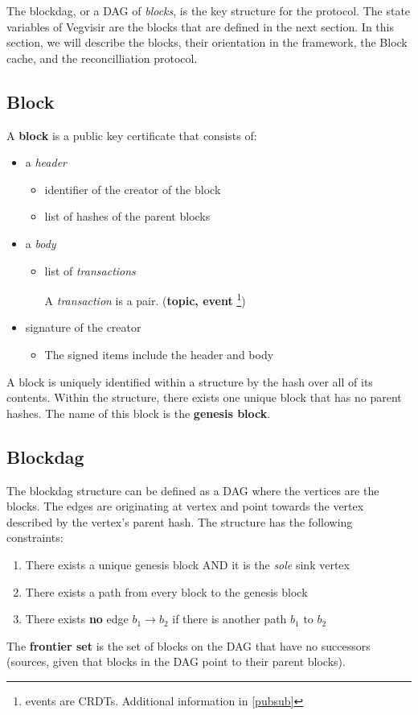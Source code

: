 The blockdag, or a DAG of \emph{blocks}, is the key structure for the protocol.
The state variables of Vegvisir are the blocks that are defined in the next
section. In this section, we will describe the blocks, their orientation in the
framework, the Block cache, and the reconcilliation protocol. 

\subsection{Block}
A \textbf{block} is a public key certificate that consists of:
\begin{itemize}
    \item a \emph{header}
    \begin{itemize}
        \item{identifier of the creator of the block}
        \item{list of hashes of the parent blocks}
    \end{itemize}
    \item a \emph{body}
        \begin{itemize}
            \item{list of \emph{transactions}}
                \begin{itemize}
                    A \emph{transaction} is a pair. (\textbf{topic, event}
                    \footnote{events are CRDTs. Additional information in
                     \ref{pubsub}})
                \end{itemize}
        \end{itemize}
    \item signature of the creator
        \begin{itemize}
            \item{The signed items include the header and body}
        \end{itemize}
\end{itemize}
A block is uniquely identified within a structure by the hash over all of its
contents. Within the structure, there exists one unique block that has no
parent hashes. The name of this block is the \textbf{genesis block}.

\subsection{Blockdag}
The blockdag structure can be defined as a DAG where the vertices are
the blocks. The edges are originating at vertex and point towards the vertex
described by the vertex's parent hash. The structure has the following
constraints:
\begin{enumerate}
    \item{There exists a unique genesis block AND it is the \emph{sole} sink vertex}
    \item{There exists a path from every block to the genesis block}
    \item{There exists \textbf{no} edge $b_1 \rightarrow b_2$ if there is 
    another path $b_1$ to $b_2$}
\end{enumerate}
The \textbf{frontier set} is the set of blocks on the DAG that have no
successors (sources, given that blocks in the DAG point to their parent
blocks).

